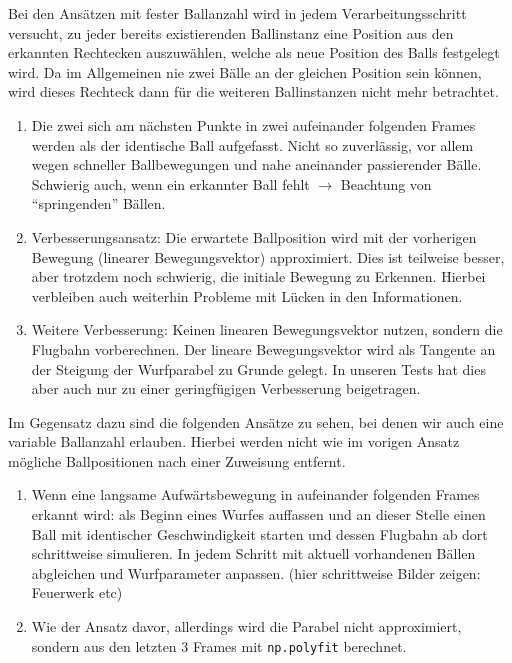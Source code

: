 \documentclass[12pt,a4paper,ngerman]{scrartcl}
\begin{document}
Bei den Ansätzen mit fester Ballanzahl wird in jedem Verarbeitungsschritt versucht,
zu jeder bereits existierenden Ballinstanz eine Position aus den erkannten Rechtecken
auszuwählen, welche als neue Position des Balls festgelegt wird. Da im Allgemeinen nie
zwei Bälle an der gleichen Position sein können, wird dieses Rechteck dann für die weiteren Ballinstanzen nicht mehr betrachtet.

 \begin{enumerate}
 \item Die zwei sich am nächsten Punkte in zwei aufeinander folgenden Frames werden als der identische Ball aufgefasst. Nicht so zuverlässig, vor allem wegen schneller Ballbewegungen und nahe aneinander passierender Bälle. Schwierig auch, wenn ein erkannter Ball fehlt $\rightarrow$ Beachtung von ``springenden'' Bällen.
 \item Verbesserungsansatz: Die erwartete Ballposition wird mit der vorherigen Bewegung (linearer Bewegungsvektor) approximiert. Dies ist teilweise besser, aber trotzdem noch schwierig, die initiale Bewegung zu Erkennen. Hierbei verbleiben auch weiterhin Probleme mit Lücken in den Informationen.
 \item Weitere Verbesserung: Keinen linearen Bewegungsvektor nutzen, sondern die Flugbahn vorberechnen. Der lineare Bewegungsvektor wird als Tangente an der Steigung der Wurfparabel zu Grunde gelegt. In unseren Tests hat dies aber auch nur zu einer geringfügigen Verbesserung beigetragen.
 \end{enumerate}

Im Gegensatz dazu sind die folgenden Ansätze zu sehen, bei denen wir auch eine variable Ballanzahl erlauben. Hierbei werden nicht wie im vorigen Ansatz mögliche Ballpositionen nach einer Zuweisung entfernt.

\begin{enumerate}
	\item Wenn eine langsame Aufwärtsbewegung in aufeinander folgenden Frames erkannt wird: als Beginn eines Wurfes auffassen und an dieser Stelle einen Ball mit identischer Geschwindigkeit starten und dessen Flugbahn ab dort schrittweise simulieren. In jedem Schritt mit aktuell vorhandenen Bällen abgleichen und Wurfparameter anpassen. (hier schrittweise Bilder zeigen: Feuerwerk etc)
	\item Wie der Ansatz davor, allerdings wird die Parabel nicht approximiert, sondern	aus den letzten 3 Frames mit \lstinline{np.polyfit} berechnet.
\end{enumerate}
\end{document}
